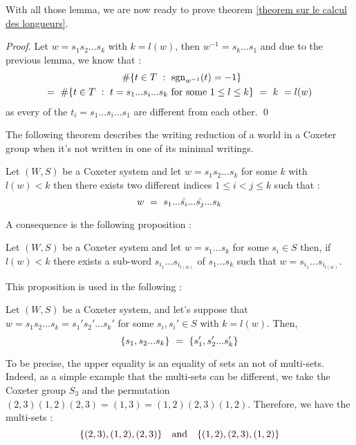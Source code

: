 With all those lemma, we are now ready to prove theorem \ref{theorem sur le calcul des longueurs}.
\begin{proof}
	Let $w=s_1s_2...s_k$ with $k=l(w)$, then $w^{-1}=s_k...s_1$ and due to the previous lemma, we know that :
	\begin{equation}
	\begin{split}
		\#\{t\in T\text{ } :\text{ } \mbox{sgn}_{w^{-1}}(t)=-1\}\text{ }\quad\quad\quad\quad\quad\quad\quad \\
		=\text{ } \# \{t\in T\text{ }:\text{ } t=s_1...s_i...s_k\text{ } \mbox{for some }1\leq l\leq k\}\text{ }=\text{ } k\text{ } =l(w)
	\end{split}
	\end{equation}
	as every of the $t_i=s_1...s_i...s_1$ are different from each other. \qed
\end{proof}


The following theorem describes the writing reduction of a world in a Coxeter group when it's not written in one of its minimal writings.
\begin{theorem}
Let $(W,S)$ be a Coxeter system and let $w=s_1s_2...s_k$ for some $k$ with $l(w)<k$ then there exists two different indices $1\leq i<j\leq k$ such that :
	\begin{equation}
	w\text{ }=\text{ } s_1...\hat{s_i}...\hat{s_j}...s_k
	\end{equation}
\end{theorem}
A consequence is the following proposition :
\begin{proposition}
	Let $(W,S)$ be a Coxeter system and let $w=s_1...s_k$ for some $s_i\in S$ then, if $l(w)<k$ there exists a sub-word $s_{i_1}...s_{i_{l(w)}}$ of $s_1...s_k$ such that $w=s_{i_1}...s_{i_{l(w)}}$.
\end{proposition}
This proposition is used in the following :
\begin{proposition}
	Let $(W,S)$ be a Coxeter system, and let's suppose that $w=s_1s_2...s_k=s_1's_2'...s_k'$ for some $s_i,s_i'\in S$ with $k=l(w) $. Then, \begin{equation}
	\{s_1,s_2...s_k\}\text{ }=\text{ } \{s_1',s_2'...s'_k\}
	\end{equation}
\end{proposition}
\begin{remark}
	To be precise, the upper equality is an equality of sets an not of multi-sets. Indeed, as a simple example that the multi-sets can be different, we take the Coxeter group $S_3$ and the permutation $(2,3)(1,2)(2,3)=(1,3)=(1,2)(2,3)(1,2)$. Therefore, we have the multi-sets :
	\begin{equation}
	\{(2,3),(1,2),(2,3)\}\quad \mbox{and}\quad \{(1,2),(2,3),(1,2)\}
	\end{equation}
\end{remark}
